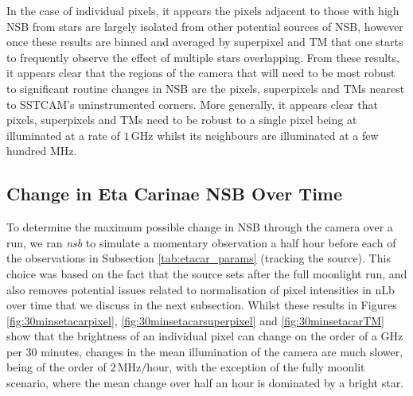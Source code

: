 In the case of individual pixels, it appears the pixels adjacent to those with high NSB from stars are largely isolated from other potential sources of NSB, however once these results are binned and averaged by superpixel and TM that one starts to frequently observe the effect of multiple stars overlapping. From these results, it appears clear that the regions of the camera that will need to be most robust to significant routine changes in NSB are the pixels, superpixels and TMs nearest to SSTCAM's uninstrumented corners. More generally, it appears clear that pixels, superpixels and TMs need to be robust to a single pixel being at illuminated at a rate of $\mathrm{1\,GHz}$ whilst its neighbours are illuminated at a few hundred MHz.

\subsection{Change in Eta Carinae NSB Over Time}
To determine the maximum possible change in NSB through the camera over a run, we ran \textit{nsb} to simulate a momentary observation a half hour before each of the observations in Subsection \ref{tab:etacar_params} (tracking the source). This choice was based on the fact that the source sets after the full moonlight run, and also removes potential issues related to normalisation of pixel intensities in nLb over time that we discuss in the next subsection. Whilst these results in Figures \ref{fig:30minsetacarpixel}, \ref{fig:30minsetacarsuperpixel} and \ref{fig:30minsetacarTM} show that the brightness of an individual pixel can change on the order of a GHz per 30 minutes, changes in the mean illumination of the camera are much slower, being of the order of $\mathrm{2\,MHz/hour}$, with the exception of the fully moonlit scenario, where the mean change over half an hour is dominated by a bright star.

